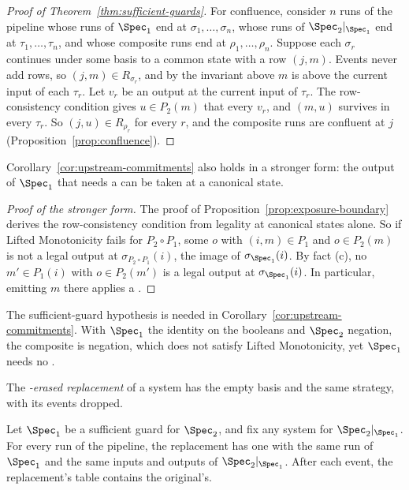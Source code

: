 \begin{proof}[Proof of Theorem~\ref{thm:sufficient-guards}]
For confluence, consider $n$ runs of the pipeline whose runs of $\Spec_1$ end
at $\sigma_1,\ldots,\sigma_n$, whose runs of $\Spec_2|_{\Spec_1}$ end at
$\tau_1,\ldots,\tau_n$, and whose composite runs end at
$\rho_1,\ldots,\rho_n$.  Suppose each $\sigma_r$ continues under some basis to
a common state with a row $(j,m)$.  Events never add rows, so $(j,m)\in
R_{\sigma_r}$, and by the invariant above $m$ is above the current input of
each $\tau_r$.  Let $v_r$ be an output at the current input of $\tau_r$.  The
row-consistency condition gives $u\in P_2(m)$ that \outrel every $v_r$, and
$(m,u)$ survives in every $\tau_r$.  So $(j,u)\in R_{\rho_r}$ for every $r$,
and the composite runs are confluent at $j$
(Proposition~\ref{prop:confluence}).
\end{proof}

Corollary~\ref{cor:upstream-commitments} also holds in a stronger form: the
output of $\Spec_1$ that needs a \commitment can be taken at a canonical state.

\begin{proof}[Proof of the stronger form]
The proof of Proposition~\ref{prop:exposure-boundary} derives the
row-consistency condition from legality at canonical states alone.  So if
Lifted Monotonicity fails for $P_2\circ P_1$, some $o$ with $(i,m)\in P_1$ and
$o\in P_2(m)$ is not a legal output at $\sigma_{P_2\circ P_1}(i)$, the image
of $\sigma_{\Spec_1}(i)$.  By fact (c), no $m'\in P_1(i)$ with $o\in P_2(m')$
is a legal output at $\sigma_{\Spec_1}(i)$.  In particular, emitting $m$
there applies a \commitment.
\end{proof}

The sufficient-guard hypothesis is needed in Corollary~\ref{cor:upstream-commitments}.  With $\Spec_1$ the identity on the booleans and
$\Spec_2$ negation, the composite is negation, which does not satisfy Lifted
Monotonicity, yet $\Spec_1$ needs no \commitment.

The \emph{\commitment-erased replacement} of a system has the empty basis and
the same strategy, with its \commitment events dropped.

\begin{corollary}
\label{cor:empty-store}
Let $\Spec_1$ be a sufficient guard for $\Spec_2$, and fix any system for $\Spec_2|_{\Spec_1}$.  For every run
of the pipeline, the replacement has one with the same run of $\Spec_1$ and
the same inputs and outputs of $\Spec_2|_{\Spec_1}$.  After each event, the
replacement's table contains the original's.
\end{corollary}

